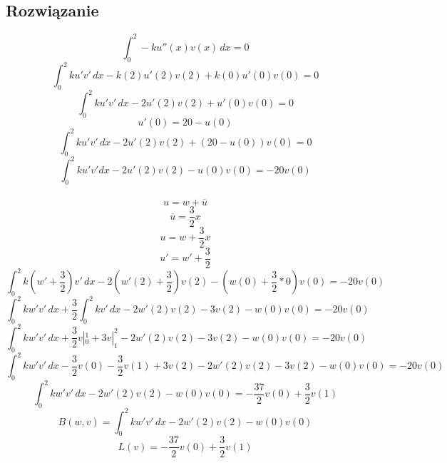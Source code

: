 \documentclass{article}
\begin{document}
\subsection{Rozwiązanie}
\begin{equation*}
    \int_0^2-k u''(x) v(x) \, dx = 0
\end{equation*}
\begin{equation*}
    \int_0^2ku'v'\,dx-k(2)u'(2)v(2)+k(0)u'(0)v(0)=0
\end{equation*}
\begin{equation}
    \int_0^2ku'v'\,dx - 2u'(2)v(2)+u'(0)v(0)=0
    \label{caleczka}
\end{equation}
\begin{equation*}
    u'(0)=20-u(0)
\end{equation*}
\begin{equation*}
    \int_0^2ku'v'\,dx - 2u'(2)v(2) + (20-u(0))v(0)=0
\end{equation*}
\begin{equation}
    \int_0^2ku'v'dx - 2u'(2)v(2) - u(0)v(0)=-20v(0)
    \label{eq:cal}
\end{equation}
\\
\begin{equation*}
    u=w+\overline{u}
\end{equation*}
\begin{equation*}
    \overline{u}=\frac{3}{2}x
\end{equation*}
\begin{equation}
    u = w + \frac{3}{2}x
\end{equation}
\begin{equation}
    u' = w' + \frac{3}{2}
\end{equation}
\begin{equation*}
    \int_0^2k(w'+\frac{3}{2})v'\,dx - 2(w'(2)+\frac{3}{2})v(2) - (w(0)+\frac{3}{2}*0)v(0)=-20v(0)
\end{equation*}
\begin{equation*}
    \int_0^2kw'v'\,dx + \frac{3}{2}\int_0^2kv'\,dx - 2w'(2)v(2)-3v(2) - w(0)v(0)=-20v(0)
\end{equation*}
\begin{equation*}
    \int_0^2kw'v'\,dx + \frac{3}{2}v|_0^1 + 3v|_1^2 - 2w'(2)v(2)-3v(2) - w(0)v(0)=-20v(0)
\end{equation*}
\begin{equation*}
    \int_0^2kw'v'\,dx - \frac{3}{2}v(0) - \frac{3}{2}v(1) + 3v(2) - 2w'(2)v(2)-3v(2) - w(0)v(0)=-20v(0)
\end{equation*}
\begin{equation*}
    \int_0^2kw'v'\,dx - 2w'(2)v(2) - w(0)v(0)=-\frac{37}{2}v(0) + \frac{3}{2}v(1)
\end{equation*}
\begin{equation}
    B(w,v) = \int_0^2kw'v'\,dx - 2w'(2)v(2) - w(0)v(0)
\end{equation}
\begin{equation}
    L(v) = -\frac{37}{2}v(0) + \frac{3}{2}v(1)
\end{equation}
\end{document}
